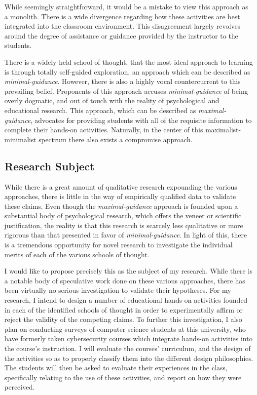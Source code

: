 \documentclass{article}
\begin{document}
    While seemingly straightforward, it would be a mistake to view this approach as a monolith.
    There is a wide divergence regarding how these activities are best integrated into the classroom environment.
    This disagreement largely revolves around the degree of assistance or guidance provided by the instructor to the students. 

    There is a widely-held school of thought, that the most ideal approach to learning is through totally self-guided exploration, an approach which can be described as \emph{minimal-guidance}. 
    However, there is also a highly vocal countercurrent to this prevailing belief. 
    Proponents of this approach accuses \emph{minimal-guidance} of being overly dogmatic, and out of touch with the reality of psychological and educational research. 
    This approach, which can be described as \emph{maximal-guidance}, advocates for providing students with all of the requisite information to complete their hands-on activities. 
    Naturally, in the center of this maximalist-minimalist spectrum there also exists a compromise approach.

    \subsection{Research Subject} 
        While there is a great amount of qualitative research expounding the various approaches, there is little in the way of empirically qualified data to validate these claims. 
    Even though the \emph{maximal-guidance} approach is founded upon a substantial body of psychological research, which offers the veneer or scientific justification, the reality is that this research is scarcely less qualitative or more rigorous than that presented in favor of \emph{minimal-guidance}. 
    In light of this, there is a tremendous opportunity for novel research to investigate the individual merits of each of the various schools of thought.

        I would like to propose precisely this as the subject of my research. 
    While there is a notable body of speculative work done on these various approaches, there has been virtually no serious investigation to validate their hypotheses. 
    For my research, I intend to design a number of educational hands-on activities founded in each of the identified schools of thought in order to experimentally affirm or reject the validity of the competing claims.
    To further this investigation, I also plan on conducting surveys of computer science students at this university, who have formerly taken cybersecurity courses which integrate hands-on activities into the course's instruction. 
    I will evaluate the courses' curriculum, and the design of the activities so as to properly classify them into the different design philosophies. 
    The students will then be asked to evaluate their experiences in the class, specifically relating to the use of these activities, and report on how they were perceived. 
\end{document}
